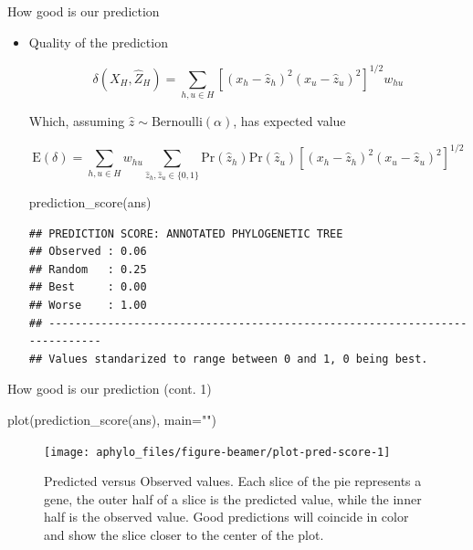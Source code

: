 \documentclass[9pt,handout,ignorenonframetext,]{beamer}
\newenvironment{Shaded}{\begin{snugshade}}{\end{snugshade}}
\newcommand{\KeywordTok}[1]{\textcolor[rgb]{0.94,0.87,0.69}{#1}}
\newcommand{\DataTypeTok}[1]{\textcolor[rgb]{0.87,0.87,0.75}{#1}}
\newcommand{\StringTok}[1]{\textcolor[rgb]{0.80,0.58,0.58}{#1}}
\newcommand{\NormalTok}[1]{\textcolor[rgb]{0.80,0.80,0.80}{#1}}
\renewcommand{\Pr}[1]{{\mbox{Pr}\left(#1\right) }}
\newcommand{\Expected}[1]{{\mbox{E}\left(#1\right)}}
\newcommand{\AnnObs}{X{}}
\newcommand{\annObs}{x{}}
\newcommand{\AnnPred}{\hat Z{}}
\newcommand{\annPred}{\hat z{}}
\begin{document}
\begin{frame}[fragile,t]{How good is our prediction}

\begin{itemize}
\item
  Quality of the prediction\pause

  \[
  \label{eq:delta1}
  \delta\left(\AnnObs_H, \AnnPred_H\right) = 
  \sum_{h, u \in H}\left[(\annObs_{h} - \annPred_{h})^2(\annObs_{u} - \annPred_{u})^2\right]^{1/2}w_{hu}
  \]

  \pause

  Which, assuming \(\annPred\sim \mbox{Bernoulli}(\alpha)\), has
  expected value

  \[
  \Expected{\delta} = 
  \sum_{h, u \in H}w_{hu}\sum_{\annPred_h, \annPred_u \in \{0,1\}}\Pr{\annPred_h}\Pr{\annPred_u}\left[
  (\annObs_{h} - \annPred_{h})^2(\annObs_{u} - \annPred_{u})^2\right]^{1/2}
  \]

  \footnotesize

\begin{Shaded}
\begin{Highlighting}[]
\KeywordTok{prediction_score}\NormalTok{(ans)}
\end{Highlighting}
\end{Shaded}

\begin{verbatim}
## PREDICTION SCORE: ANNOTATED PHYLOGENETIC TREE
## Observed : 0.06 
## Random   : 0.25 
## Best     : 0.00 
## Worse    : 1.00 
## ---------------------------------------------------------------------------
## Values standarized to range between 0 and 1, 0 being best.
\end{verbatim}

  \normalsize
\end{itemize}

\end{frame}

\begin{frame}[fragile,t]{How good is our prediction (cont. 1)}

\footnotesize

\begin{Shaded}
\begin{Highlighting}[]
\KeywordTok{plot}\NormalTok{(}\KeywordTok{prediction_score}\NormalTok{(ans), }\DataTypeTok{main=}\StringTok{""}\NormalTok{)}
\end{Highlighting}
\end{Shaded}

\begin{figure}

{\centering \texttt{[image: aphylo\_files/figure-beamer/plot-pred-score-1]} 

}

\caption{Predicted versus Observed values. Each slice of the pie represents a gene, the outer half of a slice is the predicted value, while the inner half is the observed value. Good predictions will coincide in color and show the slice closer to the center of the plot.}\label{fig:plot-pred-score}
\end{figure}

\normalsize

\end{frame}
\end{document}
